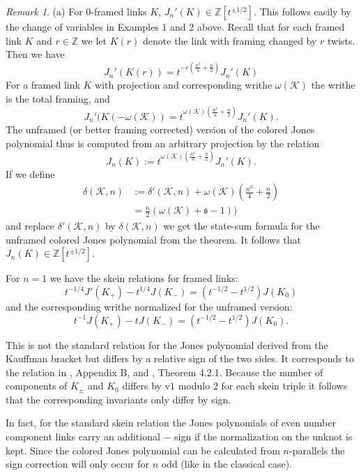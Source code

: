 \documentclass[11pt]{article}
\theoremstyle{definition}
\theoremstyle{remark}
\newtheorem*{rem}{Remark}
\theoremstyle{remark}
\begin{document}
\begin{rem}
\noindent (a) For $0$-framed links $K$, $J_n'(K)\in \mathbb{Z}[t^{\pm 1/2}]$. This follows easily by the change of variables in Examples 1 and 2 above. Recall that for each framed link $K$ and $r\in \mathbb{Z}$ we let $K(r)$ denote
the link with framing changed by $r$ twists. Then we have
$$J_n'(K(r))=t^{-r(\frac{n^2}{4}+\frac{n}{2})}J_n'(K)$$
For a framed link $K$ with projection and corresponding writhe $\omega (\mathcal{K})$ the writhe is the total framing, and 
$$J_n'(K(-\omega (\mathcal{K}))=t^{\omega (\mathcal{K})(\frac{n^2}{4}+\frac{n}{2})}J_n'(K).$$
The unframed (or better framing corrected) version of the colored Jones polynomial thus is computed from an arbitrary projection by the relation
$$J_n(K):=t^{\omega (\mathcal{K})(\frac{n^2}{4}+\frac{n}{2})}J_n'(K).$$
If we define
\begin{align*}
\delta (\mathcal{K},n)&:=\delta '(\mathcal{K},n)+\omega (\mathcal{K} )(\frac{n^2}{4}+\frac{n}{2})\\
&=\frac{n}{2}(\omega (\mathcal{K})+\mathfrak{s}-1))
\end{align*}
and replace $\delta '(\mathcal{K},n)$ by $\delta (\mathcal{K},n)$ we get the state-sum formula for the unframed colored Jones polynomial from the theorem. It follows that $J_n(K)\in \mathbb{Z}[t^{\pm 1/2}]$. 

For $n=1$ we have the skein relations for framed links:
$$t^{-1/4}J'(K_+)-t^{1/4}J(K_-)=(t^{-1/2}-t^{1/2})J(K_0)$$
and the corresponding writhe normalized for the unframed version:
$$t^{-1}J(K_+)-tJ(K_-)=(t^{-1/2}-t^{1/2})J(K_0).$$

This is not the standard relation for the Jones polynomial derived from the Kauffman bracket but differs by a relative sign of the two sides. It corresponds to the relation in \cite{GL}, Appendix B, and \cite{RT}, Theorem 4.2.1. Because the number of components of $K_{\pm}$ and $K_0$ differs by v$1$ modulo $2$ for each skein triple it follows that the corresponding invariants only differ by sign. 

In fact, for the standard skein relation the Jones polynomials of even number component links carry an additional $-$ sign if the normalization on the unknot is kept. Since the colored Jones polynomial can be calculated from $n$-parallels the sign correction will only occur for $n$ odd (like in the classical case).


\end{rem}
\end{document}
